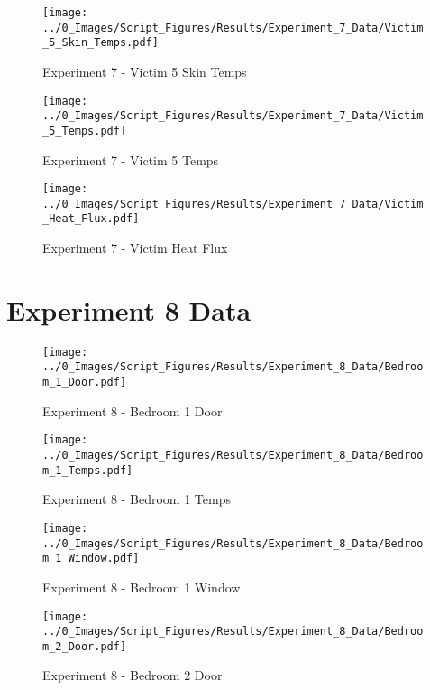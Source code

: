 	\clearpage

	\begin{figure}[H]
		\centering
		\texttt{[image: ../0\_Images/Script\_Figures/Results/Experiment\_7\_Data/Victim\_5\_Skin\_Temps.pdf]}
		\caption[]{Experiment 7 - Victim 5 Skin Temps}
	\end{figure}
 

	\begin{figure}[H]
		\centering
		\texttt{[image: ../0\_Images/Script\_Figures/Results/Experiment\_7\_Data/Victim\_5\_Temps.pdf]}
		\caption[]{Experiment 7 - Victim 5 Temps}
	\end{figure}
 
	\clearpage

	\begin{figure}[H]
		\centering
		\texttt{[image: ../0\_Images/Script\_Figures/Results/Experiment\_7\_Data/Victim\_Heat\_Flux.pdf]}
		\caption[]{Experiment 7 - Victim Heat Flux}
	\end{figure}
 

\clearpage		\large
\section{Experiment 8 Data} \label{App:Exp8Results} 

	\begin{figure}[H]
		\centering
		\texttt{[image: ../0\_Images/Script\_Figures/Results/Experiment\_8\_Data/Bedroom\_1\_Door.pdf]}
		\caption[]{Experiment 8 - Bedroom 1 Door}
	\end{figure}
 

	\begin{figure}[H]
		\centering
		\texttt{[image: ../0\_Images/Script\_Figures/Results/Experiment\_8\_Data/Bedroom\_1\_Temps.pdf]}
		\caption[]{Experiment 8 - Bedroom 1 Temps}
	\end{figure}
 
	\clearpage

	\begin{figure}[H]
		\centering
		\texttt{[image: ../0\_Images/Script\_Figures/Results/Experiment\_8\_Data/Bedroom\_1\_Window.pdf]}
		\caption[]{Experiment 8 - Bedroom 1 Window}
	\end{figure}
 

	\begin{figure}[H]
		\centering
		\texttt{[image: ../0\_Images/Script\_Figures/Results/Experiment\_8\_Data/Bedroom\_2\_Door.pdf]}
		\caption[]{Experiment 8 - Bedroom 2 Door}
	\end{figure}
 
